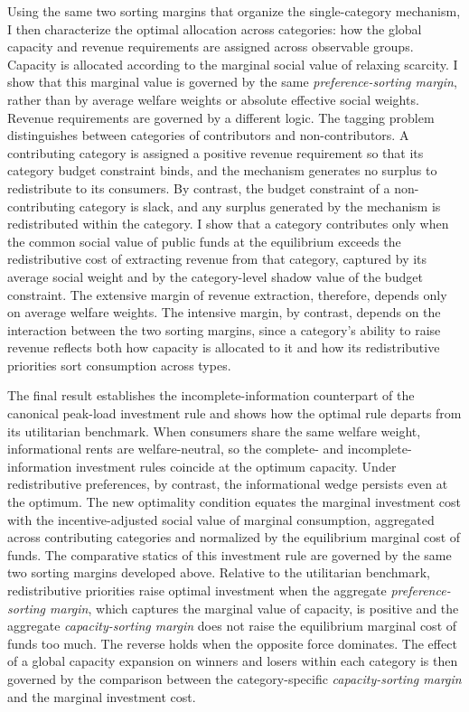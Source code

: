 \documentclass{class}
\begin{document}
Using the same two sorting margins that organize the single-category mechanism, I then characterize the optimal allocation across categories: how the global capacity and revenue requirements are assigned across observable groups. Capacity is allocated according to the marginal social value of relaxing scarcity. I show that this marginal value is governed by the same \textit{preference-sorting margin}, rather than by average welfare weights or absolute effective social weights. Revenue requirements are governed by a different logic. The tagging problem distinguishes between categories of contributors and non-contributors. A contributing category is assigned a positive revenue requirement so that its category budget constraint binds, and the mechanism generates no surplus to redistribute to its consumers. By contrast, the budget constraint of a non-contributing category is slack, and any surplus generated by the mechanism is redistributed within the category. I show that a category contributes only when the common social value of public funds at the equilibrium exceeds the redistributive cost of extracting revenue from that category, captured by its average social weight and by the category-level shadow value of the budget constraint. The extensive margin of revenue extraction, therefore, depends only on average welfare weights. The intensive margin, by contrast, depends on the interaction between the two sorting margins, since a category's ability to raise revenue reflects both how capacity is allocated to it and how its redistributive priorities sort consumption across types.

The final result establishes the incomplete-information counterpart of the canonical peak-load investment rule and shows how the optimal rule departs from its utilitarian benchmark. When consumers share the same welfare weight, informational rents are welfare-neutral, so the complete- and incomplete-information investment rules coincide at the optimum capacity. Under redistributive preferences, by contrast, the informational wedge persists even at the optimum. The new optimality condition equates the marginal investment cost with the incentive-adjusted social value of marginal consumption, aggregated across contributing categories and normalized by the equilibrium marginal cost of funds. The comparative statics of this investment rule are governed by the same two sorting margins developed above. Relative to the utilitarian benchmark, redistributive priorities raise optimal investment when the aggregate \textit{preference-sorting margin}, which captures the marginal value of capacity, is positive and the aggregate \textit{capacity-sorting margin} does not raise the equilibrium marginal cost of funds too much. The reverse holds when the opposite force dominates. The effect of a global capacity expansion on winners and losers within each category is then governed by the comparison between the category-specific \textit{capacity-sorting margin} and the marginal investment cost.
\end{document}
